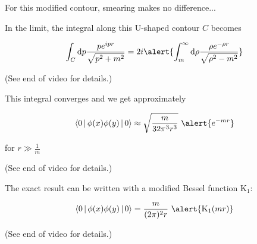 \documentclass[aspectratio=169]{beamer}
\newcommand{\integrand}{\frac{p e^{ipr}}{\sqrt{p^2 + m^2}}}
\newcommand{\diffop}{\mathop{}\!\mathrm{d}}
\newcommand{\dip}{\diffop p}
\newcommand{\drho}{\diffop \rho}
\newcommand{\phixy}{\Braket{0|\phi(x)\phi(y)|0}}
\newcommand{\cintegral}{\int_m^\infty \drho \frac{\rho e^{-\rho r}}{\sqrt{\rho^2 - m^2}}}
\begin{document}
\begin{frame}
For this modified contour, smearing makes no difference...
\end{frame}




\begin{frame}
In the limit, the integral along this \alert{U}-shaped contour $C$ becomes

\pause
\begin{equation*}
\int_C \dip \integrand = 2i \alert{\cintegral}
\end{equation*}

\medskip
(See end of video for details.)
\end{frame}


\begin{frame}
This integral \alert{converges} and we get \alert{approximately}

\pause
\begin{equation*}
\phixy \approx \sqrt{\frac{m}{32\pi^3 r^3}} \ \alert{e^{-mr}}
\end{equation*}

\medskip
for $r \gg \frac{1}{m}$

\medskip
(See end of video for details.)
\end{frame}


\begin{frame}
The \alert{exact} result can be written with a \alert{modified Bessel function} $\mathrm{K}_1$:

\pause
\begin{equation*}
\phixy = \frac{m}{(2\pi)^2 r} \  \alert{\mathrm{K}_1(mr)}
\end{equation*}

\medskip
(See end of video for details.)
\end{frame}
\end{document}
